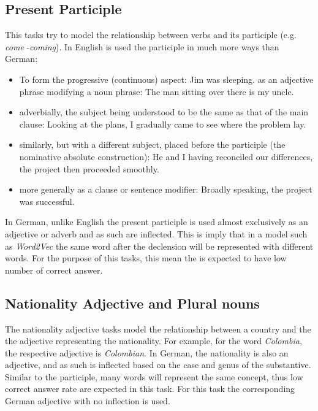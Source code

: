 %
\subsection{Present Participle}
\label{sec:sub_sec_present_participle}

This tasks try to model the relationship between verbs and its participle
(e.g. \textit{come} -\textit{coming}). In English is used the participle in
much more ways than German: 

\begin{itemize}
\item  To form the progressive (continuous) aspect: Jim was sleeping. as an
  adjective phrase modifying a noun phrase: The man sitting over there is my
  uncle.
\item adverbially, the subject being understood to be the same as that
  of the main clause: Looking at the plans, I gradually came to see where the
  problem lay.
\item  similarly, but with a different subject, placed before the
  participle (the nominative absolute construction): He and I having
  reconciled our differences, the project then proceeded smoothly.
\item more
  generally as a clause or sentence modifier: Broadly speaking, the project
  was successful.

\end{itemize}

In German, unlike English  the present participle is used almost exclusively as an
adjective or adverb and as such are inflected. This is imply that in a model
such as  \textit{Word2Vec} the same word after the declension will be
represented with different words. For the purpose of this tasks, this mean
the is expected to have low number of correct answer.

\subsection{Nationality Adjective and  Plural nouns}
\label{sec:sub_sec_nat_plu}

The nationality adjective tasks model the relationship between a country and
the the adjective representing the nationality. For example, for the word
\textit{Colombia}, the respective adjective is \textit{Colombian}. In German,
the nationality is also an adjective, and as such is inflected based on the
case and genus of the substantive. Similar to the participle, many words will
represent the same concept, thus low correct answer rate are expected in this
task.  For this task the corresponding German adjective with no inflection is  used.

